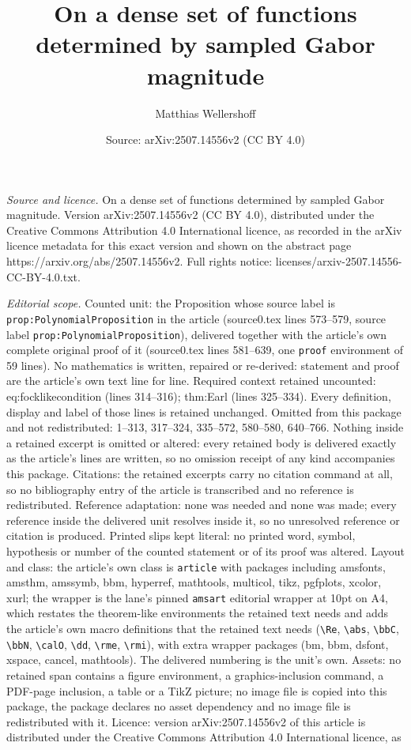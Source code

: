 \documentclass[10pt,a4paper]{amsart}
\title[On a dense set of functions determined by sampled Gabor magn]{On a dense set of functions determined by sampled Gabor magnitude}
\author{Matthias Wellershoff}
\date{Source: arXiv:2507.14556v2 (CC BY 4.0)}
\begin{document}
\maketitle

\noindent\emph{Source and licence.} On a dense set of functions determined by sampled Gabor magnitude. Version arXiv:2507.14556v2 (CC BY 4.0), distributed under the Creative Commons Attribution 4.0 International licence, as recorded in the arXiv licence metadata for this exact version and shown on the abstract page https://arxiv.org/abs/2507.14556v2. Full rights notice: licenses/arxiv-2507.14556-CC-BY-4.0.txt.\par\smallskip

\noindent\textit{Editorial scope.} Counted unit: the Proposition whose source label is \texttt{prop:PolynomialProposition} in the article (source0.tex lines 573--579, source label \texttt{prop:PolynomialProposition}), delivered together with the article's own complete original proof of it (source0.tex lines 581--639, one \texttt{proof} environment of 59 lines). No mathematics is written, repaired or re-derived: statement and proof are the article's own text line for line. Required context retained uncounted: eq:focklikecondition (lines 314--316); thm:Earl (lines 325--334). Every definition, display and label of those lines is retained unchanged. Omitted from this package and not redistributed: 1--313, 317--324, 335--572, 580--580, 640--766. Nothing inside a retained excerpt is omitted or altered: every retained body is delivered exactly as the article's lines are written, so no omission receipt of any kind accompanies this package. Citations: the retained excerpts carry no citation command at all, so no bibliography entry of the article is transcribed and no reference is redistributed. Reference adaptation: none was needed and none was made; every reference inside the delivered unit resolves inside it, so no unresolved reference or citation is produced. Printed slips kept literal: no printed word, symbol, hypothesis or number of the counted statement or of its proof was altered. Layout and class: the article's own class is \texttt{article} with packages including amsfonts, amsthm, amssymb, bbm, hyperref, mathtools, multicol, tikz, pgfplots, xcolor, xurl; the wrapper is the lane's pinned \texttt{amsart} editorial wrapper at 10pt on A4, which restates the theorem-like environments the retained text needs and adds the article's own macro definitions that the retained text needs (\texttt{\textbackslash Re}, \texttt{\textbackslash abs}, \texttt{\textbackslash bbC}, \texttt{\textbackslash bbN}, \texttt{\textbackslash calO}, \texttt{\textbackslash dd}, \texttt{\textbackslash rme}, \texttt{\textbackslash rmi}), with extra wrapper packages (bm, bbm, dsfont, xspace, cancel, mathtools). The delivered numbering is the unit's own. Assets: no retained span contains a figure environment, a graphics-inclusion command, a PDF-page inclusion, a table or a TikZ picture; no image file is copied into this package, the package declares no asset dependency and no image file is redistributed with it. Licence: version arXiv:2507.14556v2 of this article is distributed under the Creative Commons Attribution 4.0 International licence, as 
\end{document}
